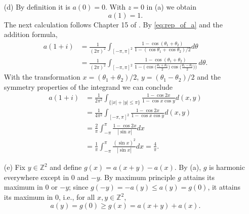 \documentclass[11pt]{article}
\makeatletter
\renewenvironment{proof}[1][\proofname]{
   \par\pushQED{\qed}\normalfont
   \topsep6\p@\@plus6\p@\relax
   \trivlist\item[\hskip\labelsep\bfseries#1\@addpunct{.}]
   \ignorespaces
}{
   \popQED\endtrivlist\@endpefalse
}
\numberwithin{equation}{section}
\makeatother
\begin{document}
\begin{proof}
\begin{itemize}
    \item[(d)] By definition it is $a(0) = 0$. 
    With $z = 0$ in (a) we obtain
    \begin{equation}\nonumber
      a(1) = 1.
    \end{equation}
    The next calculation follows Chapter 15 of \cite{spitzer}. 
    By \eqref{eq:rep_of_a} and the addition formula,
    \begin{equation}\nonumber
      \begin{split}
        a(1+i) 
        &= \frac{1}{(2\pi)^2} \int_{[-\pi, \pi]^2}
          \frac{1-\cos(\theta_1 + \theta_2)}
                {1-(\cos \theta_1 + \cos \theta_2)/2}
                d \theta\\
        &=  \frac{1}{(2\pi)^2} \int_{[-\pi, \pi]^2}
        \frac{1-\cos(\theta_1 + \theta_2)}
            {1-\Big( \cos \Big( \frac{\theta_1+\theta_2}{2}\Big)  
            \cos \Big( \frac{\theta_1 - \theta_2}{2} \Big) \Big)} \,
            d \theta.
      \end{split}
    \end{equation}
    With the transformation 
    $x = (\theta_1 + \theta_2)/2$, 
    $y = (\theta_1 - \theta_2)/2$ and 
    the symmetry properties of the integrand we can conclude 
    \begin{equation}\nonumber
    \begin{split}
      a(1+i) &= 
      \frac{1}{2 \pi^2}
        \int_{\{|x|+|y| \leq \pi\} }
        \frac{1-\cos 2 x}
        {1 - \cos x \cos y } d(x,y)\\
      &= \frac{1}{4 \pi^2} 
        \int_{[-\pi, \pi]^2} 
        \frac{1-\cos 2 x}
        {1 - \cos x \cos y } d(x,y)\\
      &= \frac{2}{\pi} 
        \int_{-\pi}^{\pi} 
        \frac{1-\cos 2 x}{|\sin x|}
        d x\\
      &= \frac{1}{\pi} 
        \int_{-\pi}^{\pi}
        \frac{(\sin x)^2}{|\sin x|} d x
      = \frac{4}{\pi}.
    \end{split}
    \end{equation}

  \item[(e)] 
    Fix $y\in \mathbb{Z}^2$ and define $g(x)= a(x+y)-a(x)$.
    By (a), $g$ is harmonic everywhere except in $0$ and $-y$. 
    By maximum principle $g$ attains its maximum in $0$ or $-y$; 
    since $g(-y) = - a(y) \leq a(y) = g(0)$, it attains its maximum 
    in $0$, i.e., for all $x,y \in \mathbb{Z}^2$,
    \begin{equation*}
       a(y) = g(0) \geq g(x) = a(x+y) + a(x).
    \end{equation*}
  \end{itemize}
\end{proof}
\end{document}
